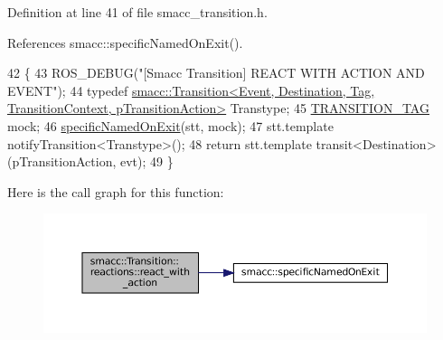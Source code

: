 Definition at line 41 of file smacc\+\_\+transition.\+h.



References smacc\+::specific\+Named\+On\+Exit().


\begin{DoxyCode}
42     \{
43       ROS\_DEBUG(\textcolor{stringliteral}{"[Smacc Transition] REACT WITH ACTION AND EVENT"});
44       \textcolor{keyword}{typedef} 
      \hyperlink{classsmacc_1_1Transition}{smacc::Transition<Event, Destination, Tag, TransitionContext, pTransitionAction>}
       Transtype;
45       \hyperlink{classsmacc_1_1Transition_a672e883135344c4aea140381dd4d1c1d}{TRANSITION\_TAG} mock;
46       \hyperlink{namespacesmacc_afd94fcb8f8c410a0ced7954bf76e845d}{specificNamedOnExit}(stt, mock);
47       stt.template notifyTransition<Transtype>();
48       \textcolor{keywordflow}{return} stt.template transit<Destination>(pTransitionAction, evt);
49     \}
\end{DoxyCode}
Here is the call graph for this function\+:
\nopagebreak
\begin{figure}[H]
\begin{center}
\leavevmode
\includegraphics[width=350pt]{structsmacc_1_1Transition_1_1reactions_a843ddc3d10e2aec66a702745852455c3_cgraph}
\end{center}
\end{figure}
\mbox{\label{structsmacc_1_1Transition_1_1reactions_a96a69cf5b0cbd1e8fc49ca57efb37581}} 
